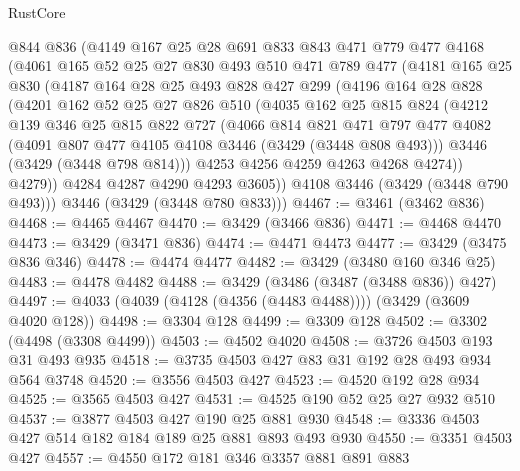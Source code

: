 \begin{lexlean}{RustCore}
\begin{coremodule}
    @844
    @836
    (@4149
      @167
      @25
      @28
      @691
      @833
      @843
      @471
      @779
      @477
      @4168
      (@4061
        @165
        @52
        @25
        @27
        @830
        @493
        @510
        @471
        @789
        @477
        (@4181
          @165
          @25
          @830
          (@4187
            @164
            @28
            @25
            @493
            @828
            @427
            @299
            (@4196
              @164
              @28
              @828
              (@4201
                @162
                @52
                @25
                @27
                @826
                @510
                (@4035
                  @162
                  @25
                  @815
                  @824
                  (@4212
                    @139
                    @346
                    @25
                    @815
                    @822
                    @727
                    (@4066
                      @814
                      @821
                      @471
                      @797
                      @477
                      @4082
                      (@4091 @807 @477 @4105 @4108 @3446 (@3429 (@3448 @808 @493)))
                      @3446
                      (@3429 (@3448 @798 @814)))
                    @4253
                    @4256
                    @4259
                    @4263
                    @4268
                    @4274))
                @4279))
            @4284
            @4287
            @4290
            @4293
            @3605))
        @4108
        @3446
        (@3429 (@3448 @790 @493)))
      @3446
      (@3429 (@3448 @780 @833)))
@4467 := @3461 (@3462 @836)
@4468 := @4465 @4467
@4470 := @3429 (@3466 @836)
@4471 := @4468 @4470
@4473 := @3429 (@3471 @836)
@4474 := @4471 @4473
@4477 := @3429 (@3475 @836 @346)
@4478 := @4474 @4477
@4482 := @3429 (@3480 @160 @346 @25)
@4483 := @4478 @4482
@4488 := @3429 (@3486 (@3487 (@3488 @836)) @427)
@4497 := @4033 (@4039 (@4128 (@4356 (@4483 @4488)))) (@3429 (@3609 @4020 @128))
@4498 := @3304 @128
@4499 := @3309 @128
@4502 := @3302 (@4498 (@3308 @4499))
@4503 := @4502 @4020
@4508 := @3726 @4503 @193 @31 @493 @935
@4518 := @3735 @4503 @427 @83 @31 @192 @28 @493 @934 @564 @3748
@4520 := @3556 @4503 @427
@4523 := @4520 @192 @28 @934
@4525 := @3565 @4503 @427
@4531 := @4525 @190 @52 @25 @27 @932 @510
@4537 := @3877 @4503 @427 @190 @25 @881 @930
@4548 := @3336 @4503 @427 @514 @182 @184 @189 @25 @881 @893 @493 @930
@4550 := @3351 @4503 @427
@4557 := @4550 @172 @181 @346 @3357 @881 @891 @883

\end{coremodule}
\end{lexlean}
